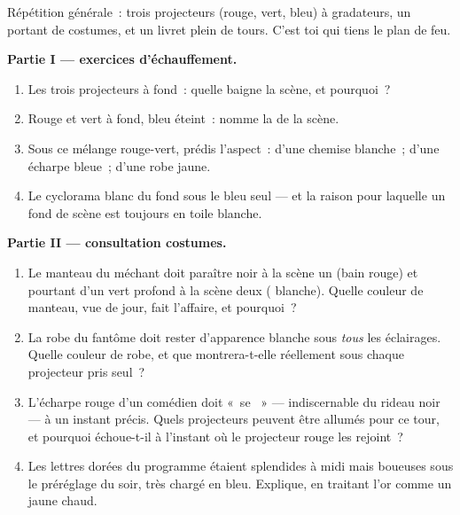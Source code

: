 \begin{problem}\label{pb:g8:colors-spectra:1}
Répétition générale~: trois projecteurs (rouge, vert, bleu) à
gradateurs, un portant de costumes, et un livret plein de tours.
C'est toi qui tiens le plan de feu.

\medskip\noindent\textbf{Partie I --- exercices d'échauffement.}
\begin{enumerate}
  \item Les trois projecteurs à fond~: quelle  baigne la
        scène, et pourquoi~?
  \item Rouge et vert à fond, bleu éteint~: nomme la  de la
        scène.
  \item Sous ce mélange rouge-vert, prédis l'aspect~: d'une chemise
        blanche~; d'une écharpe bleue~; d'une robe jaune.
  \item Le cyclorama blanc du fond sous le bleu seul --- et la
        raison pour laquelle un fond de scène est toujours en toile
        blanche.
\end{enumerate}

\medskip\noindent\textbf{Partie II --- consultation costumes.}
\begin{enumerate}[resume]
  \item Le manteau du méchant doit paraître noir à la scène un
        (bain rouge) et pourtant d'un vert profond à la scène deux
        ( blanche). Quelle couleur de manteau, vue de jour,
        fait l'affaire, et pourquoi~?
  \item La robe du fantôme doit rester d'apparence blanche sous
        \emph{tous} les éclairages. Quelle couleur de robe, et que
        montrera-t-elle réellement sous chaque projecteur pris
        seul~?
  \item L'écharpe rouge d'un comédien doit «~se ~» ---
        indiscernable du rideau noir --- à un instant précis. Quels
        projecteurs peuvent être allumés pour ce tour, et pourquoi
        échoue-t-il à l'instant où le projecteur rouge les
        rejoint~?
  \item Les lettres dorées du programme étaient splendides à midi
        mais boueuses sous le préréglage du soir, très chargé en
        bleu. Explique, en traitant l'or comme un jaune chaud.
\end{enumerate}


\end{problem}
